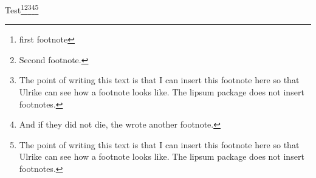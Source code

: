 \documentclass[footnotes=multiple]{scrbook}
\begin{document}
    Test\footnote{%
    first footnote
    }\footnote{
    Second footnote.
    }\footnote{
      The point of writing this text is that I can insert this footnote here so that Ulrike can see how
      a footnote looks like. The lipsum package does not insert footnotes.
    }\footnote{
      And if they did not die, the wrote another footnote.
    }\footnote{
      The point of writing this text is that I can insert this footnote here so that Ulrike can see how
      a footnote looks like. The lipsum package does not insert footnotes.
    }




    
\end{document}
